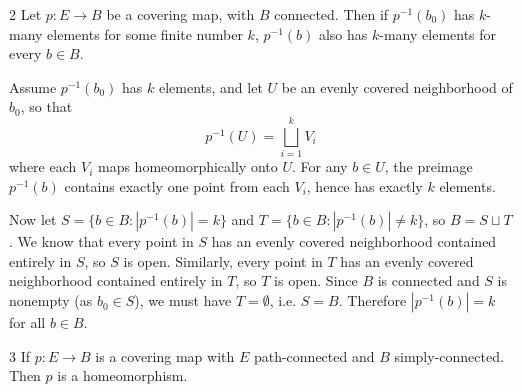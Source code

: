 \documentclass[12pt]{article}
\begin{document}
\newpage 

\begin{problem}{2}
    Let $p: E \to B$ be a covering map, with $B$ connected. Then if $p^{-1}(b_0)$ has $k$-many elements for some finite number $k$, $p^{-1}(b)$ also has $k$-many elements for every $b \in B$. 
\end{problem}

\begin{solution}
    \bbni

    Assume $p^{-1}(b_0)$ has $k$ elements, and let $U$ be an evenly covered neighborhood of $b_0$, so that
    \[
        p^{-1}(U) = \bigsqcup_{i=1}^{k} V_i
    \]
    where each $V_i$ maps homeomorphically onto $U$. For any $b \in U$,
    the preimage $p^{-1}(b)$ contains exactly one point from each $V_i$, hence has exactly $k$ elements.
    
   

    Now let $S = \{b \in B : |p^{-1}(b)| = k\}$ and $T = \{b \in B :
    |p^{-1}(b)| \neq k\}$, so $B = S \sqcup T$. We know that every
    point in $S$ has an evenly covered neighborhood contained entirely
    in $S$, so $S$ is open. Similarly, every point in $T$ has an evenly covered neighborhood contained entirely in $T$, so $T$ is open. Since $B$ is connected and $S$ is nonempty (as $b_0 \in S$), we must have $T = \emptyset$, i.e. $S = B$. Therefore $|p^{-1}(b)| = k$ for all $b \in B$. 
\end{solution}

\newpage 

\begin{problem}{3}
    If $p: E \to B$ is a covering map with $E$ path-connected and $B$ simply-connected. Then $p$ is a homeomorphism.
\end{problem}
\end{document}
